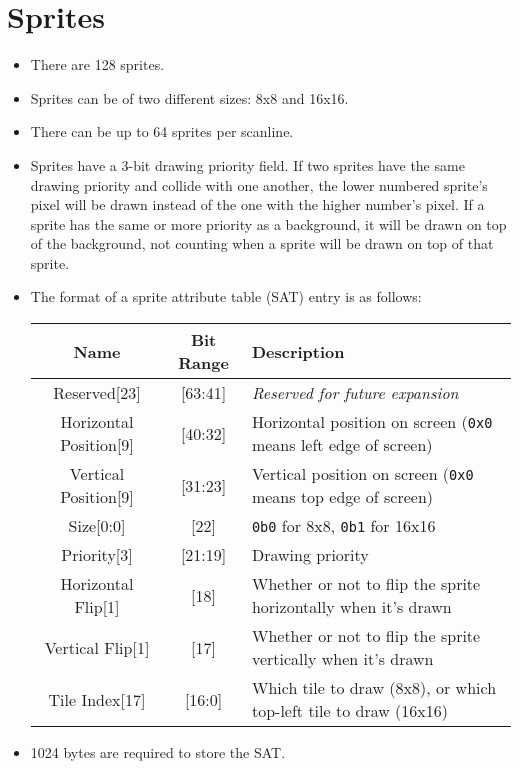 \documentclass{article}
\begin{document}
\section{Sprites}
	\begin{itemize}
	\item There are 128 sprites.

	\item Sprites can be of two different sizes:  8x8 and 16x16.

	\item There can be up to 64 sprites per scanline.

	\item Sprites have a 3-bit drawing priority field.  If two sprites have
	the same drawing priority and collide with one another, the lower
	numbered sprite's pixel will be drawn instead of the one with the higher
	number's pixel.  If a sprite has the same or more priority as a
	background, it will be drawn on top of the background, not counting
	when a sprite will be drawn on top of that sprite.

	\item The format of a sprite attribute table (SAT) entry is as follows:
		\begin{table}[H]
			\begin{center}
				\begin{tabular}{|c|c|p{55mm}|}
					\hline
					\textbf{Name} & \textbf{Bit Range} 
						& \textbf{Description}\\
					\hline
					Reserved[23] & [63:41]
						& \textit{Reserved for future expansion}\\
					Horizontal Position[9] & [40:32]
						& Horizontal position on screen
						\newline (\texttt{0x0} means left edge of screen)\\
					Vertical Position[9] & [31:23]
						& Vertical position on screen
						\newline (\texttt{0x0} means top edge of screen)\\
					Size[0:0] & [22]
						& \texttt{0b0} for 8x8, \texttt{0b1} for 16x16 \\
					Priority[3] & [21:19]
						& Drawing priority\\
					Horizontal Flip[1] & [18]
						& Whether or not to flip the sprite horizontally
						when it's drawn\\
					Vertical Flip[1] & [17]
						& Whether or not to flip the sprite vertically
						when it's drawn\\
					Tile Index[17] & [16:0]
						& Which tile to draw (8x8), 
						\newline or which top-left tile to draw (16x16) \\
					\hline
				\end{tabular}
			\end{center}
		\end{table}

	\item 1024 bytes are required to store the SAT.
	\end{itemize}
	\newpage
\end{document}
